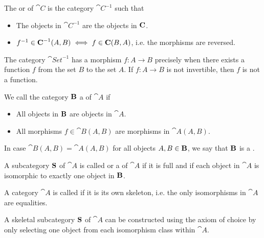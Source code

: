 \begin{definition}\label{def:opposite_category}
  The  or  of \( \cat{C} \) is the category \( \cat{C}^{-1} \) such that
  \begin{itemize}
    \item The objects in \( \cat{C}^{-1} \) are the objects in \( \operatorname{\mathbf{C}} \).
    \item \( f^{-1} \in \operatorname{\mathbf{C}}^{-1}(A, B) \iff f \in \operatorname{\mathbf{C}}(B, A) \), i.e. the morphisms are reversed.
  \end{itemize}
\end{definition}

\begin{example}
  The category \( \cat{Set}^{-1} \) has a morphism \( f: A \to B \) precisely when there exists a function \( f \) from the set \( B \) to the set \( A \). If \( f: A \to B \) is not invertible, then \( f \) is not a function.
\end{example}

\begin{definition}\label{def:subcategory}
  We call the category \( \operatorname{\mathbf{B}} \) a  of \( \cat{A} \) if
  \begin{itemize}
    \item All objects in \( \operatorname{\mathbf{B}} \) are objects in \( \cat{A} \).
    \item All morphisms \( f \in \cat{B}(A, B) \) are morphisms in \( \cat{A}(A, B) \).
  \end{itemize}

  In case \( \cat{B}(A, B) = \cat{A}(A, B) \) for all objects \( A, B \in \operatorname{\mathbf{B}} \), we say that \( \operatorname{\mathbf{B}} \) is a .
\end{definition}

\begin{definition}\label{def:skeletal_category}
  A subcategory \( \operatorname{\mathbf{S}} \) of \( \cat{A} \) is called  or a  of \( \cat{A} \) if it is full and if each object in \( \cat{A} \) is isomorphic to exactly one object in \( \operatorname{\mathbf{B}} \).

  A category \( \cat{A} \) is called  if it is its own skeleton, i.e. the only isomorphisms in \( \cat{A} \) are equalities.
\end{definition}

\begin{remark}\label{rem:skeletal_subcategory_exists}
  A skeletal subcategory \( \operatorname{\mathbf{S}} \) of \( \cat{A} \) can be constructed using the axiom of choice by only selecting one object from each isomorphism class within \( \cat{A} \).
\end{remark}

